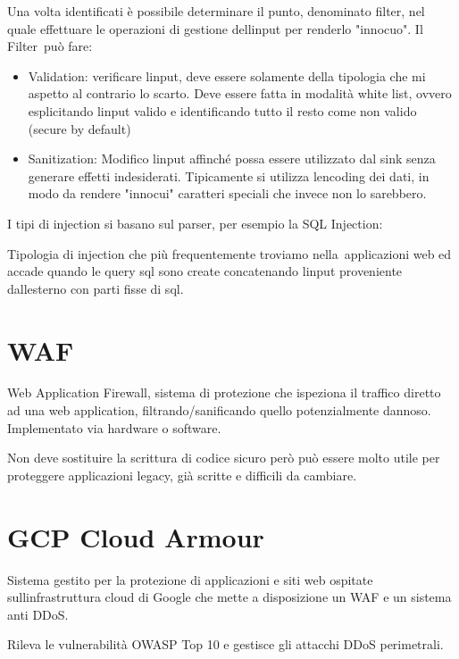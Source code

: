 \documentclass[
]{article}
\providecommand{\tightlist}{%
  \setlength{\itemsep}{0pt}\setlength{\parskip}{0pt}}
\begin{document}
{Una volta identificati è possibile determinare il punto, denominato
filter, nel quale effettuare le operazioni di gestione
dell\textquotesingle input per renderlo "innocuo". Il }{Filter}{~può
fare:}

{}

\begin{itemize}
\tightlist
\item
  {Validation}{: verificare l\textquotesingle input, deve essere
  }{solamente }{della tipologia che mi aspetto al contrario lo scarto.
  Deve essere }{fatta in modalità white list}{, ovvero esplicitando
  l\textquotesingle input valido e identificando tutto il resto come non
  valido (secure by default)}
\end{itemize}

{}

\begin{itemize}
\tightlist
\item
  {Sanitization}{: Modifico l\textquotesingle input affinché possa
  essere utilizzato dal sink senza generare effetti indesiderati.
  Tipicamente si utilizza l\textquotesingle encoding dei dati, in modo
  da rendere "innocui" caratteri speciali che invece non lo sarebbero.}
\end{itemize}

{}

{I tipi di injection si basano sul parser, per esempio la }{SQL
Injection:}

{}

{Tipologia di injection che più frequentemente troviamo
}{nella}{~applicazioni web ed accade quando le query sql sono create
concatenando l\textquotesingle input proveniente
dall\textquotesingle esterno con parti fisse di sql.}

{}

\section{\texorpdfstring{{WAF}}{WAF}}\label{h.e6mfd4bh70jt}

{Web Application Firewall, sistema di protezione che ispeziona il
traffico diretto ad una web application, filtrando/sanificando quello
potenzialmente dannoso. Implementato via hardware o software.}

{}

{Non deve sostituire la scrittura di codice sicuro però può essere molto
utile per proteggere applicazioni legacy, già scritte e difficili da
cambiare.}

{}

\section{\texorpdfstring{{GCP Cloud
Armour}}{GCP Cloud Armour}}\label{h.nqg62y1qokz6}

{Sistema gestito per la protezione di applicazioni e siti web ospitate
sull\textquotesingle infrastruttura cloud di Google che mette a
disposizione un WAF e un sistema anti DDoS.}

{}

{Rileva le vulnerabilità OWASP Top 10 e gestisce gli attacchi DDoS
perimetrali.}
\end{document}
